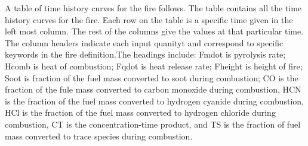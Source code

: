 A table of time history curves for the fire follows.  The table contains all the time history curves for the fire.  Each row on the table is a specific time given in the left most column.  The rest of the columns give the values at that particular time.  The column headers indicate each input quanityt and correspond to specific keywords in the fire definition.The headings include: Fmdot is pyrolysis rate; Hcomb is heat of combustion; Fqdot is heat release rate; Fheight is height of fire; Soot is fraction of the fuel mass converted to soot during combustion; CO is the fraction of the fule mass converted to carbon monoxide during combustion, HCN is the fraction of the fuel mass converted to hydrogen cyanide during combustion, HCl is the fraction of the fuel mass converted to hydrogen chloride during combustion, CT is the concentration-time product, and TS is the fraction of fuel mass converted to trace species during combustion.

